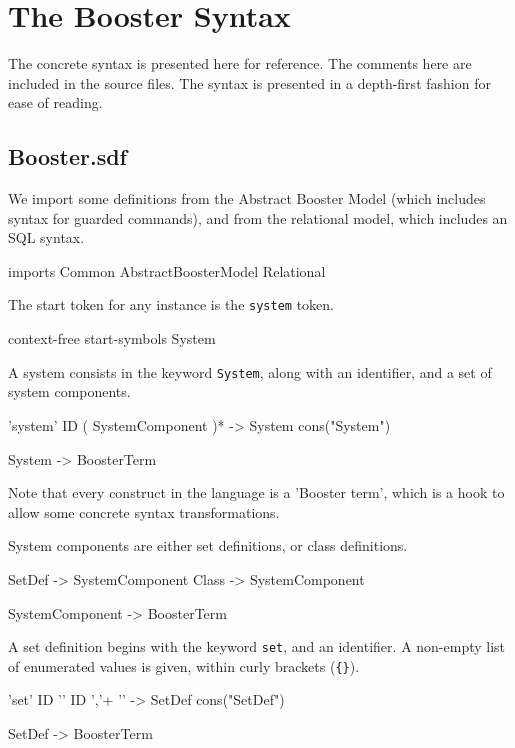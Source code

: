 \chapter{The Booster Syntax}

The concrete syntax is presented here for reference.  The comments
here are included in the source files.  The syntax is presented in a
depth-first fashion for ease of reading.

\section{Booster.sdf}

We import some definitions from the Abstract Booster Model (which
includes syntax for guarded commands), and from the relational model,
which includes an SQL syntax.

\begin{code}
imports Common AbstractBoosterModel Relational
\end{code}

The start token for any instance is the \verb|system| token.

\begin{code}
context-free start-symbols
  System
\end{code}  	  	

A system consists in the keyword \verb|System|, along with an
identifier, and a set of system components.
\begin{code}
'system' ID ( SystemComponent )* -> System {cons("System")}

System -> BoosterTerm
\end{code}

Note that every construct in the language is a 'Booster term', which
is a hook to allow some concrete syntax transformations.

System components are either set definitions, or class definitions.
\begin{code}
SetDef -> SystemComponent
Class  -> SystemComponent

SystemComponent -> BoosterTerm
\end{code}

A set definition begins with the keyword \verb|set|, and an
identifier.  A non-empty list of enumerated values is given, within
curly brackets (\verb|{}|). 

\begin{code}	 
'set' ID '{' {ID ','}+ '}' -> SetDef {cons("SetDef")}

SetDef -> BoosterTerm
\end{code}

